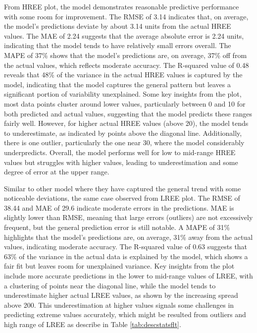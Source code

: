 \documentclass[11pt,a4paper,]{article}
\begin{document}
From HREE plot, the model demonstrates reasonable predictive performance with some room for improvement. The RMSE of 3.14 indicates that, on average, the model's predictions deviate by about 3.14 units from the actual HREE values. The MAE of 2.24 suggests that the average absolute error is 2.24 units, indicating that the model tends to have relatively small errors overall. The MAPE of 37\% shows that the model's predictions are, on average, 37\% off from the actual values, which reflects moderate accuracy. The R-squared value of 0.48 reveals that 48\% of the variance in the actual HREE values is captured by the model, indicating that the model captures the general pattern but leaves a significant portion of variability unexplained. Some key insights from the plot, most data points cluster around lower values, particularly between 0 and 10 for both predicted and actual values, suggesting that the model predicts these ranges fairly well. However, for higher actual HREE values (above 20), the model tends to underestimate, as indicated by points above the diagonal line. Additionally, there is one outlier, particularly the one near 30, where the model considerably underpredicts. Overall, the model performs well for low to mid-range HREE values but struggles with higher values, leading to underestimation and some degree of error at the upper range.

Similar to other model where they have captured the general trend with some noticeable deviations, the same case observed from LREE plot. The RMSE of 38.44 and MAE of 29.6 indicate moderate errors in the predictions. MAE is slightly lower than RMSE, meaning that large errors (outliers) are not excessively frequent, but the general prediction error is still notable. A MAPE of 31\% highlights that the model's predictions are, on average, 31\% away from the actual values, indicating moderate accuracy. The R-squared value of 0.63 suggests that 63\% of the variance in the actual data is explained by the model, which shows a fair fit but leaves room for unexplained variance. Key insights from the plot include more accurate predictions in the lower to mid-range values of LREE, with a clustering of points near the diagonal line, while the model tends to underestimate higher actual LREE values, as shown by the increasing spread above 200. This underestimation at higher values signals some challenges in predicting extreme values accurately, which might be resulted from outliers and high range of LREE as describe in Table \ref{tab:descstatsflt}.
\end{document}
